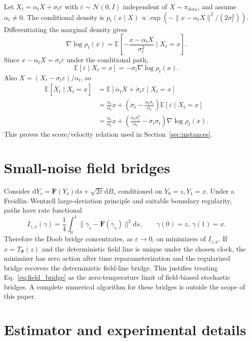\documentclass{article}
\numberwithin{equation}{section}
\newcommand{\E}{\mathbb{E}}
\newcommand{\dd}{\mathrm{d}}
\newcommand{\pdata}{\pi_{\mathrm{data}}}
\newcommand{\eps}{\varepsilon}
\newcommand{\F}{\bm F}
\begin{document}
Let $X_t=\alpha_tX+\sigma_t\eps$ with $\eps\sim\mathcal N(0,I)$ independent of $X\sim\pdata$, and assume $\alpha_t\ne0$. The conditional density is $p_t(x\mid X)\propto\exp(-\|x-\alpha_tX\|^2/(2\sigma_t^2))$. Differentiating the marginal density gives
\begin{equation}
\nabla\log\rho_t(x)=\E\left[-\frac{x-\alpha_tX}{\sigma_t^2}\mid X_t=x\right].
\end{equation}
Since $x-\alpha_tX=\sigma_t\eps$ under the conditional path,
\begin{equation}
\E[\eps\mid X_t=x]=-\sigma_t\nabla\log\rho_t(x).
\end{equation}
Also $X=(X_t-\sigma_t\eps)/\alpha_t$, so
\begin{align}
\E[\dot X_t\mid X_t=x]
&=\E[\dot\alpha_t X+\dot\sigma_t\eps\mid X_t=x]\\
&=\frac{\dot\alpha_t}{\alpha_t}x+
\left(\dot\sigma_t-\frac{\dot\alpha_t\sigma_t}{\alpha_t}\right)\E[\eps\mid X_t=x]\\
&=\frac{\dot\alpha_t}{\alpha_t}x+
\left(\frac{\dot\alpha_t\sigma_t^2}{\alpha_t}-\dot\sigma_t\sigma_t\right)\nabla\log\rho_t(x).
\end{align}
This proves the score/velocity relation used in Section~\ref{sec:instances}.

\section{Small-noise field bridges}
\label{app:doob}

Consider $\dd Y_s=\F(Y_s)\dd s+\sqrt{2\eps}\dd B_s$ conditioned on $Y_0=z,Y_1=x$. Under a Freidlin--Wentzell large-deviation principle and suitable boundary regularity, paths have rate functional
\begin{equation}
    I_{z,x}(\gamma)=\frac14\int_0^1\|\dot\gamma_s-\F(\gamma_s)\|^2\dd s,
    \qquad \gamma(0)=z,\ \gamma(1)=x.
\end{equation}
Therefore the Doob bridge concentrates, as $\eps\to0$, on minimizers of $I_{z,x}$. If $x=T_\Phi(z)$ and the deterministic field line is unique under the chosen clock, the minimizer has zero action after time reparameterization and the regularized bridge recovers the deterministic field-line bridge. This justifies treating Eq.~\eqref{eq:field_bridge} as the zero-temperature limit of field-biased stochastic bridges. A complete numerical algorithm for these bridges is outside the scope of this paper.

\section{Estimator and experimental details}
\label{app:experiments}
\end{document}
